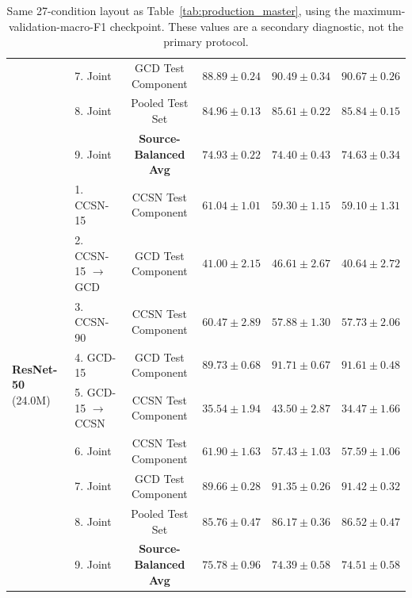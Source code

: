 \documentclass[11pt,a4paper]{article}
\begin{document}
\begin{table}[!htbp]
{\begin{tabular}{llcccc}
& 7. Joint & GCD Test Component & $88.89 \pm 0.24$ & $90.49 \pm 0.34$ & $90.67 \pm 0.26$ \\
& 8. Joint & Pooled Test Set & $84.96 \pm 0.13$ & $85.61 \pm 0.22$ & $85.84 \pm 0.15$ \\
& 9. Joint & \textbf{Source-Balanced Avg} & $74.93 \pm 0.22$ & $74.40 \pm 0.43$ & $74.63 \pm 0.34$ \\
\midrule
\multirow{9}{*}{\textbf{ResNet-50} (24.0M)}
& 1. CCSN-15 & CCSN Test Component & $61.04 \pm 1.01$ & $59.30 \pm 1.15$ & $59.10 \pm 1.31$ \\
& 2. CCSN-15 $\to$ GCD & GCD Test Component & $41.00 \pm 2.15$ & $46.61 \pm 2.67$ & $40.64 \pm 2.72$ \\
& 3. CCSN-90 & CCSN Test Component & $60.47 \pm 2.89$ & $57.88 \pm 1.30$ & $57.73 \pm 2.06$ \\
& 4. GCD-15 & GCD Test Component & $89.73 \pm 0.68$ & $91.71 \pm 0.67$ & $91.61 \pm 0.48$ \\
& 5. GCD-15 $\to$ CCSN & CCSN Test Component & $35.54 \pm 1.94$ & $43.50 \pm 2.87$ & $34.47 \pm 1.66$ \\
& 6. Joint & CCSN Test Component & $61.90 \pm 1.63$ & $57.43 \pm 1.03$ & $57.59 \pm 1.06$ \\
& 7. Joint & GCD Test Component & $89.66 \pm 0.28$ & $91.35 \pm 0.26$ & $91.42 \pm 0.32$ \\
& 8. Joint & Pooled Test Set & $85.76 \pm 0.47$ & $86.17 \pm 0.36$ & $86.52 \pm 0.47$ \\
& 9. Joint & \textbf{Source-Balanced Avg} & $\mathbf{75.78 \pm 0.96}$ & $74.39 \pm 0.58$ & $74.51 \pm 0.58$ \\
\bottomrule
\end{tabular}%
}
\caption{Same 27-condition layout as Table~\ref{tab:production_master}, using the maximum-validation-macro-F1 checkpoint. These values are a secondary diagnostic, not the primary protocol.}
\label{tab:production_master_f1}
\end{table}
\end{document}
